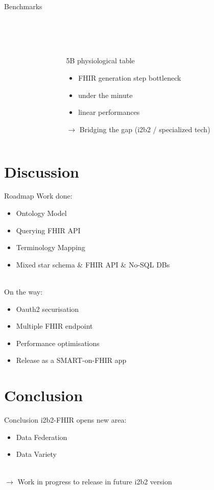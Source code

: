 \documentclass[10pt]{beamer}
\begin{document}
\begin{frame}{Benchmarks}{}
\begin{columns}[T,onlytextwidth]
\begin{column}{.6\textwidth}
        \end{column}
        \begin{column}{.4\textwidth}
            \begin{onlyenv}
                \begin{minipage}{\textwidth}
			~\\
			~\\
			~\\
	5B physiological table
	\begin{itemize}
		\item FHIR generation step bottleneck
		\item under the minute
		\item linear performances
	\end{itemize}
			$\rightarrow$ Bridging the gap (i2b2 / specialized tech)
                \end{minipage}
            \end{onlyenv}
        \end{column}
    \end{columns} 

\end{frame}

\section{Discussion}
\begin{frame}{Roadmap}{}
Work done:
\begin{itemize}
\item Ontology Model
\item Querying FHIR API
\item Terminology Mapping
\item Mixed star schema \& FHIR API \& No-SQL DBs
\end{itemize}
~
	\\
	On the way:
\begin{itemize}
\item Oauth2 securisation
\item Multiple FHIR endpoint 
\item Performance optimisations
\item Release as a SMART-on-FHIR app 
\end{itemize}
\end{frame}

\section{Conclusion}
\begin{frame}{Conclusion}{}
	i2b2-FHIR opens new area:
\begin{itemize}
\item Data Federation
\item Data Variety
\end{itemize}
~\\
$\rightarrow$ Work in progress to release in future i2b2 version
\end{frame}
\end{document}
